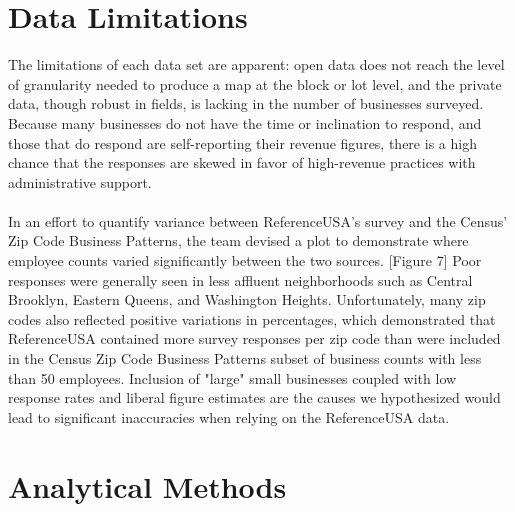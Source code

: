 \documentclass[article, 11pt]{article} %
\begin{document}
\section*{Data Limitations}

The limitations of each data set are apparent: open data does not reach the level of granularity needed to produce a map at the block or lot level, and the private data, though robust in fields, is lacking in the number of businesses surveyed. Because many businesses do not have the time or inclination to respond, and those that do respond are self-reporting their revenue figures, there is a high chance that the responses are skewed in favor of high-revenue practices with administrative support. 
\\\\
In an effort to quantify variance between ReferenceUSA's survey and the Census' Zip Code Business Patterns, the team devised a plot to demonstrate where employee counts varied significantly between the two sources. [Figure 7] Poor responses were generally seen in less affluent neighborhoods such as Central Brooklyn, Eastern Queens, and Washington Heights. Unfortunately, many zip codes also reflected positive variations in percentages, which demonstrated that ReferenceUSA contained more survey responses per zip code than were included in the Census Zip Code Business Patterns subset of business counts with less than 50 employees. Inclusion of "large" small businesses coupled with low response rates and liberal figure estimates are the causes we hypothesized would lead to significant inaccuracies when relying on the ReferenceUSA data.


\section*{Analytical Methods}
\end{document}
